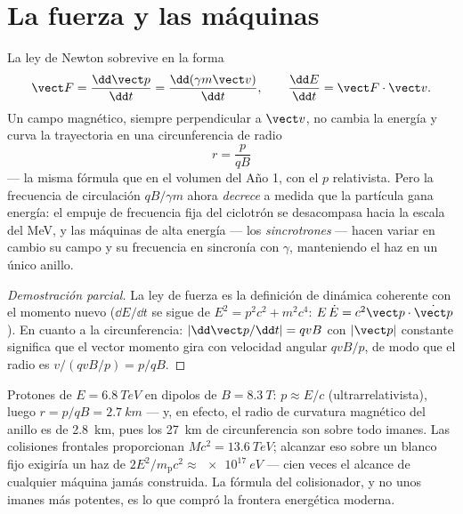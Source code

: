 \section{La fuerza y las máquinas}

\begin{proposition}\label{prop:b3:relativistic-dynamics:force}
La ley de Newton sobrevive en la forma
\[
\vect F = \frac{\dd\vect p}{\dd t} = \frac{\dd(\gamma m\vect v)}
{\dd t} , \qquad
\frac{\dd E}{\dd t} = \vect F\cdot\vect v .
\]
Un campo magnético, siempre perpendicular a $\vect v$, no cambia la energía
y curva la trayectoria en una circunferencia de radio
\[
r = \frac{p}{qB}
\]
--- la misma fórmula que en el volumen del Año 1, con el $p$ relativista.
Pero la frecuencia de circulación $qB/\gamma m$ ahora \emph{decrece} a
medida que la partícula gana energía: el empuje de frecuencia fija del
ciclotrón se desacompasa hacia la escala del MeV, y las máquinas de alta
energía --- los \emph{sincrotrones} --- hacen variar en cambio su campo y su
frecuencia en sincronía con $\gamma$, manteniendo el haz en un único anillo.
\end{proposition}

\begin{proof}[Demostración parcial]
La ley de fuerza es la definición de dinámica coherente con el momento nuevo
($\dd E/\dd t$ se sigue de
$E^2 = p^2c^2 + m^2c^4$: $E\,\dot E = c^2\vect p\cdot\dot{\vect p}$).
En cuanto a la circunferencia: $|\dd\vect p/\dd t| = qvB$ con $|\vect p|$
constante significa que el vector momento gira con velocidad angular
$qvB/p$, de modo que el radio es $v/(qvB/p) = p/qB$.
\end{proof}

\begin{example}\label{ex:b3:relativistic-dynamics:lhc}
Protones de $E = \qty{6.8}{TeV}$ en dipolos de $B = \qty{8.3}{T}$:
$p \approx E/c$ (ultrarrelativista), luego $r = p/qB =
\qty{2.7}{km}$ --- y, en efecto, el radio de curvatura magnético del anillo
es de \qty{2.8}{km}, pues los \qty{27}{km} de circunferencia son sobre todo
imanes. Las colisiones frontales proporcionan $Mc^2 = \qty{13.6}{TeV}$;
alcanzar eso sobre un blanco fijo exigiría un haz de $2E^2/m_{\text{p}}c^2 \approx
\qty{e17}{eV}$ --- cien veces el alcance de cualquier máquina jamás
construida. La fórmula del colisionador, y no unos imanes más potentes, es
lo que compró la frontera energética moderna.
\end{example}

